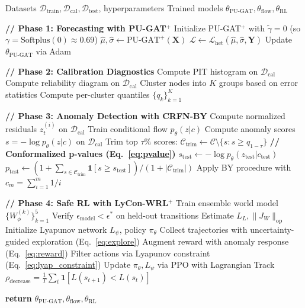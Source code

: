 \documentclass{article}
\newcommand{\RETURN}{\STATE \textbf{return} }
\theoremstyle{plain}
\theoremstyle{definition}
\theoremstyle{remark}
\begin{document}
\begin{algorithm}[H]
\caption{STREAM-RLTraining Pipeline}
\label{alg:full_pipeline}
\begin{algorithmic}[1]
\REQUIRE Datasets $\mathcal{D}_{\text{train}}, \mathcal{D}_{\text{cal}}, \mathcal{D}_{\text{test}}$, hyperparameters
\ENSURE Trained models $\theta_{\text{PU-GAT}}, \theta_{\text{flow}}, \theta_{\text{RL}}$

\STATE \textbf{// Phase 1: Forecasting with PU-GAT$^+$}
\STATE Initialize PU-GAT$^+$ with $\tilde{\gamma} = 0$ (so $\gamma = \text{Softplus}(0) \approx 0.69$)
        \STATE $\hat{\mu}, \hat{\sigma} \leftarrow \text{PU-GAT}^+(\mathbf{X})$
        \STATE $\mathcal{L} \leftarrow \mathcal{L}_{\text{het}}(\hat{\mu}, \hat{\sigma}, \mathbf{Y})$ 
        \STATE Update $\theta_{\text{PU-GAT}}$ via Adam
    \ENDFOR
\ENDFOR

\STATE \textbf{// Phase 2: Calibration Diagnostics}
\STATE Compute PIT histogram on $\mathcal{D}_{\text{cal}}$
\STATE Compute reliability diagram on $\mathcal{D}_{\text{cal}}$
\STATE Cluster nodes into $K$ groups based on error statistics
\STATE Compute per-cluster quantiles $\{q_k\}_{k=1}^K$

\STATE \textbf{// Phase 3: Anomaly Detection with CRFN-BY}
\STATE Compute normalized residuals $z_t^{(i)}$ on $\mathcal{D}_{\text{cal}}$
\STATE Train conditional flow $p_\theta(z|c)$
\STATE Compute anomaly scores $s = -\log p_\theta(z|c)$ on $\mathcal{D}_{\text{cal}}$
\STATE Trim top $\tau\%$ scores: $\mathcal{C}_{\text{trim}} \leftarrow \mathcal{C} \setminus \{s : s \geq q_{1-\tau}\}$
\STATE \textbf{// Conformalized p-values (Eq.~\ref{eq:pvalue})}
    \STATE $s_{\text{test}} \leftarrow -\log p_\theta(z_{\text{test}} | c_{\text{test}})$
    \STATE $p_{\text{test}} \leftarrow (1 + \sum_{s \in \mathcal{C}_{\text{trim}}} \mathbf{1}[s \geq s_{\text{test}}]) / (1 + |\mathcal{C}_{\text{trim}}|)$
\ENDFOR
\STATE Apply BY procedure with $c_m = \sum_{i=1}^m 1/i$

\STATE \textbf{// Phase 4: Safe RL with LyCon-WRL$^+$}
\STATE Train ensemble world model $\{W_\phi^{(k)}\}_{k=1}^5$
\STATE Verify $\epsilon_{\text{model}} < \epsilon^*$ on held-out transitions
\STATE Estimate $L_L, \|J_W\|_{\text{op}}$
\STATE Initialize Lyapunov network $L_\psi$, policy $\pi_\theta$
    \STATE Collect trajectories with uncertainty-guided exploration (Eq.~\ref{eq:explore})
    \STATE Augment reward with anomaly response (Eq.~\ref{eq:reward})
    \STATE Filter actions via Lyapunov constraint (Eq.~\ref{eq:lyap_constraint})
    \STATE Update $\pi_\theta, L_\psi$ via PPO with Lagrangian
    \STATE Track $\rho_{\text{decrease}} = \frac{1}{T}\sum_t \mathbf{1}[L(s_{t+1}) < L(s_t)]$
\ENDFOR

\RETURN $\theta_{\text{PU-GAT}}, \theta_{\text{flow}}, \theta_{\text{RL}}$
\end{algorithmic}
\end{algorithm}
\end{document}
